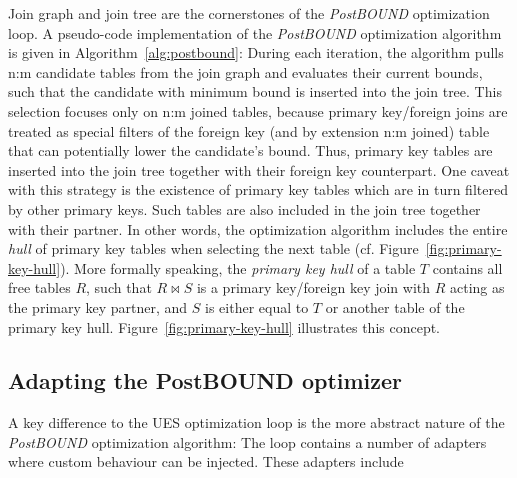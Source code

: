 Join graph and join tree are the cornerstones of the \emph{PostBOUND} optimization loop. 
A pseudo-code implementation of the \emph{PostBOUND} optimization algorithm is given in Algorithm~\ref{alg:postbound}: During each iteration, the algorithm pulls n:m candidate tables from the join graph and evaluates their current bounds, such that the candidate with minimum bound is inserted into the join tree. 
This selection focuses only on n:m joined tables, because primary key/foreign joins are treated as special filters of the foreign key (and by extension n:m joined) table that can potentially lower the candidate's bound.
Thus, primary key tables are inserted into the join tree together with their foreign key counterpart.
One caveat with this strategy is the existence of primary key tables which are in turn filtered by other primary keys. 
Such tables are also included in the join tree together with their partner. 
In other words, the optimization algorithm includes the entire \emph{hull} of primary key tables when selecting the next table (cf. Figure~\ref{fig:primary-key-hull}). More formally speaking, the \emph{primary key hull} of a table $T$ contains all free tables $R$, such that $R \bowtie S$ is a primary key/foreign key join with $R$ acting as the primary key partner, and $S$ is either equal to $T$ or another table of the primary key hull. Figure~\ref{fig:primary-key-hull} illustrates this concept.

\subsection{Adapting the PostBOUND optimizer}
\label{sec:postbound-optimizer-adapters}

A key difference to the UES optimization loop is the more abstract nature of the \emph{PostBOUND} optimization algorithm: The loop contains a number of adapters where custom behaviour can be injected. These adapters include 

